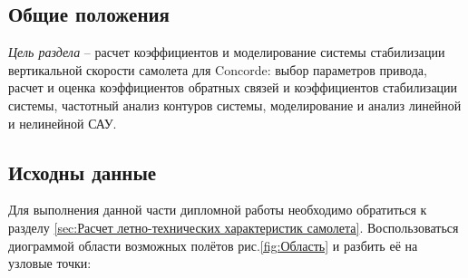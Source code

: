 
\subsection{Общие положения}

\textit{Цель раздела} -- расчет коэффициентов и моделирование системы стабилизации вертикальной скорости самолета для Concorde: выбор параметров привода, расчет и оценка коэффициентов обратных связей и коэффициентов стабилизации системы, частотный анализ контуров системы, моделирование и анализ линейной и нелинейной САУ. 

\subsection{Исходны данные}

Для выполнения данной части дипломной работы необходимо обратиться к разделу \ref{sec:Расчет летно-технических характеристик самолета}. Воспользоваться диограммой области возможных полётов рис.\ref{fig:Область} и разбить её на узловые точки:

